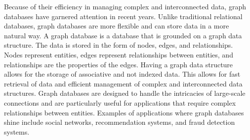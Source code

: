 
Because of their efficiency in managing complex and interconnected data, graph databases have garnered attention in recent years. Unlike traditional relational databases, graph databases are more flexible and can store data in a more natural way. A graph database is a database that is grounded on a graph data structure. The data is stored in the form of nodes, edges, and relationships. Nodes represent entities, edges represent relationships between entities, and relationships are the properties of the edges. Having a graph data structure allows for the storage of associative and not indexed data. This allows for fast retrieval of data and efficient management of complex and interconnected data structures. Graph databases are designed to handle the intricacies of large-scale connections and are particularly useful for applications that require complex relationships between entities. Examples of applications where graph databases shine include social networks, recommendation systems, and fraud detection systems. 












